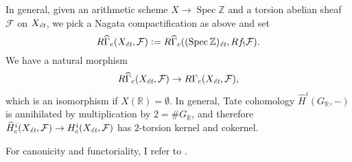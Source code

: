 \documentclass[leqno,12pt]{article}
\theoremstyle{plain}
\theoremstyle{definition}
\DeclareMathOperator{\Spec}{Spec}
\newcommand{\RR}{\mathbb{R}}
\newcommand{\ZZ}{\mathbb{Z}}
\newcommand{\dfn}{\mathrel{\mathop:}=}
\newcommand{\et}{\text{\it \'{e}t}}
\begin{document}
In general, given an arithmetic scheme $X \to \Spec \ZZ$ and a torsion abelian
sheaf $\mathcal{F}$ on $X_\et$, we pick a Nagata compactification as above and
set
\[ R\widehat{\Gamma}_c (X_\et, \mathcal{F}) \dfn
  R\widehat{\Gamma}_c ((\Spec \ZZ)_\et, R f_! \mathcal{F}). \]
We have a natural morphism
$$R\widehat{\Gamma}_c (X_\et, \mathcal{F}) \to R\Gamma_c (X_\et, \mathcal{F}),$$
which is an isomorphism if $X (\RR) = \emptyset$. In general, Tate cohomology
$\widehat{H}^i (G_\RR, -)$ is annihilated by multiplication by $2 = \# G_\RR$,
and therefore
$\widehat{H}^i_c (X_\et,\mathcal{F}) \to H^i_c (X_\et,\mathcal{F})$ has
$2$-torsion kernel and cokernel.

For canonicity and functoriality, I refer to \cite[\S 2]{Geisser-Schmidt-2018}.

\end{document}
